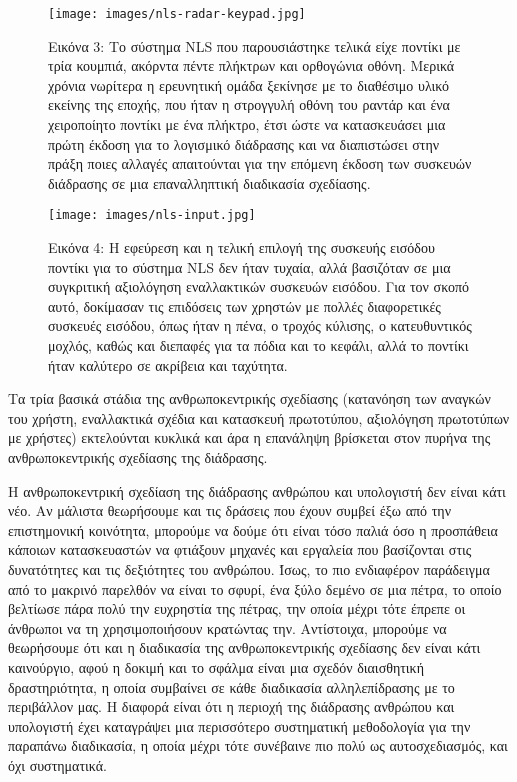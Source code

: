 \documentclass[
]{article}
\begin{document}
\leavevmode{}%
\begin{figure}
\hypertarget{fig:nls-radar-keypad}{%
\centering
\texttt{[image: images/nls-radar-keypad.jpg]}
\caption{Εικόνα 3: Το σύστημα NLS που παρουσιάστηκε τελικά είχε ποντίκι
με τρία κουμπιά, ακόρντα πέντε πλήκτρων και ορθογώνια οθόνη. Μερικά
χρόνια νωρίτερα η ερευνητική ομάδα ξεκίνησε με το διαθέσιμο υλικό
εκείνης της εποχής, που ήταν η στρογγυλή οθόνη του ραντάρ και ένα
χειροποίητο ποντίκι με ένα πλήκτρο, έτσι ώστε να κατασκευάσει μια πρώτη
έκδοση για το λογισμικό διάδρασης και να διαπιστώσει στην πράξη ποιες
αλλαγές απαιτούνται για την επόμενη έκδοση των συσκευών διάδρασης σε μια
επαναλληπτική διαδικασία σχεδίασης.}\label{fig:nls-radar-keypad}
}
\end{figure}

\leavevmode{}%
\begin{figure}
\hypertarget{fig:nls-input}{%
\centering
\texttt{[image: images/nls-input.jpg]}
\caption{Εικόνα 4: Η εφεύρεση και η τελική επιλογή της συσκευής εισόδου
ποντίκι για το σύστημα NLS δεν ήταν τυχαία, αλλά βασιζόταν σε μια
συγκριτική αξιολόγηση εναλλακτικών συσκευών εισόδου. Για τον σκοπό αυτό,
δοκίμασαν τις επιδόσεις των χρηστών με πολλές διαφορετικές συσκευές
εισόδου, όπως ήταν η πένα, ο τροχός κύλισης, ο κατευθυντικός μοχλός,
καθώς και διεπαφές για τα πόδια και το κεφάλι, αλλά το ποντίκι ήταν
καλύτερο σε ακρίβεια και ταχύτητα.}\label{fig:nls-input}
}
\end{figure}

Τα τρία βασικά στάδια της ανθρωποκεντρικής σχεδίασης (κατανόηση των
αναγκών του χρήστη, εναλλακτικά σχέδια και κατασκευή πρωτοτύπου,
αξιολόγηση πρωτοτύπων με χρήστες) εκτελούνται κυκλικά και άρα η
επανάληψη βρίσκεται στον πυρήνα της ανθρωποκεντρικής σχεδίασης της
διάδρασης.

Η ανθρωποκεντρική σχεδίαση της διάδρασης ανθρώπου και υπολογιστή δεν
είναι κάτι νέο. Αν μάλιστα θεωρήσουμε και τις δράσεις που έχουν συμβεί
έξω από την επιστημονική κοινότητα, μπορούμε να δούμε ότι είναι τόσο
παλιά όσο η προσπάθεια κάποιων κατασκευαστών να φτιάξουν μηχανές και
εργαλεία που βασίζονται στις δυνατότητες και τις δεξιότητες του
ανθρώπου. Ίσως, το πιο ενδιαφέρον παράδειγμα από το μακρινό παρελθόν να
είναι το σφυρί, ένα ξύλο δεμένο σε μια πέτρα, το οποίο βελτίωσε πάρα
πολύ την ευχρηστία της πέτρας, την οποία μέχρι τότε έπρεπε οι άνθρωποι
να τη χρησιμοποιήσουν κρατώντας την. Αντίστοιχα, μπορούμε να θεωρήσουμε
ότι και η διαδικασία της ανθρωποκεντρικής σχεδίασης δεν είναι κάτι
καινούργιο, αφού η δοκιμή και το σφάλμα είναι μια σχεδόν διαισθητική
δραστηριότητα, η οποία συμβαίνει σε κάθε διαδικασία αλληλεπίδρασης με το
περιβάλλον μας. Η διαφορά είναι ότι η περιοχή της διάδρασης ανθρώπου και
υπολογιστή έχει καταγράψει μια περισσότερο συστηματική μεθοδολογία για
την παραπάνω διαδικασία, η οποία μέχρι τότε συνέβαινε πιο πολύ ως
αυτοσχεδιασμός, και όχι συστηματικά.
\end{document}
